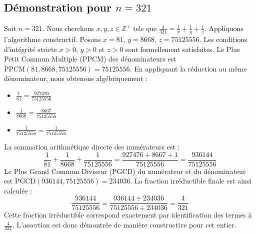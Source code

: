 \documentclass[11pt,a4paper]{article}
\begin{document}
\subsection{Démonstration pour $n = 321$}
Soit $n = 321$. Nous cherchons $x, y, z \in \mathbb{Z}^{+}$ tels que $\frac{4}{321} = \frac{1}{x} + \frac{1}{y} + \frac{1}{z}$.
Appliquons l'algorithme constructif. Posons $x = 81$, $y = 8668$, $z = 75125556$.
Les conditions d'intégrité stricte $x > 0$, $y > 0$ et $z > 0$ sont formellement satisfaites.
Le Plus Petit Commun Multiple (PPCM) des dénominateurs est $\text{PPCM}(81, 8668, 75125556) = 75125556$.
En appliquant la réduction au même dénominateur, nous obtenons algébriquement :
\begin{itemize}
    \item $\frac{1}{81} = \frac{927476}{75125556}$
    \item $\frac{1}{8668} = \frac{8667}{75125556}$
    \item $\frac{1}{75125556} = \frac{1}{75125556}$
\end{itemize}
La sommation arithmétique directe des numérateurs est :
$$ \frac{1}{81} + \frac{1}{8668} + \frac{1}{75125556} = \frac{927476 + 8667 + 1}{75125556} = \frac{936144}{75125556} $$
Le Plus Grand Commun Diviseur (PGCD) du numérateur et du dénominateur est $\text{PGCD}(936144, 75125556) = 234036$.
La fraction irréductible finale est ainsi calculée :
$$ \frac{936144}{75125556} = \frac{936144 \div 234036}{75125556 \div 234036} = \frac{4}{321} $$
Cette fraction irréductible correspond exactement par identification des termes à $\frac{4}{321}$. L'assertion est donc démontrée de manière constructive pour cet entier.
\end{document}
